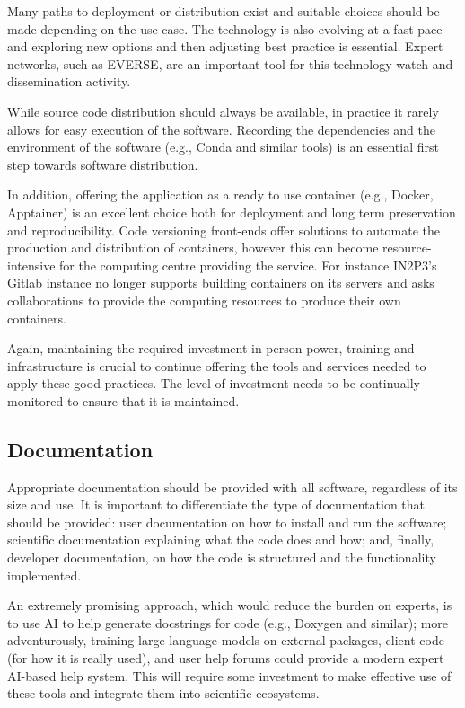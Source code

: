 Many paths to deployment or distribution exist and suitable choices should be made depending on the use case. The technology is also evolving at a fast pace and exploring new options and then adjusting best practice is essential. Expert networks, such as EVERSE, are an important tool for this technology watch and dissemination activity. 

While source code distribution should always be available, in practice it rarely allows for easy execution of the software. Recording the dependencies and the environment of the software (e.g., Conda and similar tools) is an essential first step towards software distribution.

In addition, offering the application as a ready to use container (e.g., Docker, Apptainer) is an excellent choice both for deployment and long term preservation and reproducibility. Code versioning front-ends offer solutions to automate the production and distribution of containers, however this can become resource-intensive for the computing centre providing the service. For instance IN2P3's Gitlab instance no longer supports building containers on its servers and asks collaborations to provide the computing resources to produce their own containers.

Again, maintaining the required investment in person power, training and infrastructure is crucial to continue offering the tools and services needed to apply these good practices.  The level of investment needs to be continually monitored to ensure that it is maintained.


\subsection{Documentation}

Appropriate documentation should be provided with all software, regardless of its size and use. It is important to differentiate the type of documentation that should be provided: user documentation on how to install and run the software; scientific documentation explaining what the code does and how; and, finally, developer documentation, on how the code is structured and the functionality implemented.

An extremely promising approach, which would reduce the burden on experts, is to use AI to help generate docstrings for code (e.g., Doxygen and similar); more adventurously, training large language models on external packages, client code (for how it is really used), and user help forums could provide a modern expert AI-based help system. This will require some investment to make  effective use of these tools and integrate them into scientific ecosystems.

